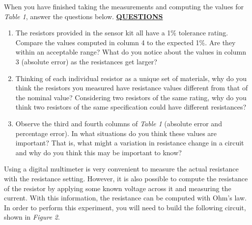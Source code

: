 \documentclass[12pt]{article}
\begin{document}
When you have finished taking the measurements and computing the values for \textit{Table 1}, answer the questions below.
\newpage
\textbf{\underline{QUESTIONS}}
\begin{enumerate}
    
    \item The resistors provided in the sensor kit all have a 1\% tolerance rating. Compare the values computed in column 4 to the expected 1\%. Are they within an acceptable range? What do you notice about the values in column 3 (absolute error) as the resistances get larger? 
        \fillwithlines{1in}
        
    \item Thinking of each individual resistor as a unique set of materials, why do you think the resistors you measured have resistance values different from that of the nominal value? Considering two resistors of the same rating, why do you think two resistors of the same specification could have different resistances?
        \fillwithlines{1in}
        
    \item Observe the third and fourth columns of \textit{Table 1} (absolute error and percentage error). In what situations do you think these values are important? That is, what might a variation in resistance change in a circuit and why do you think this may be important to know?
        \fillwithlines{0.8in}

\end{enumerate}         

Using a digital multimeter is very convenient to measure the actual resistance with the resistance setting. However, it is also possible to compute the resistance of the resistor by applying some known voltage across it and measuring the current. With this information, the resistance can be computed with Ohm's law. In order to perform this experiment, you will need to build the following circuit, shown in \textit{Figure 2}.
\end{document}

